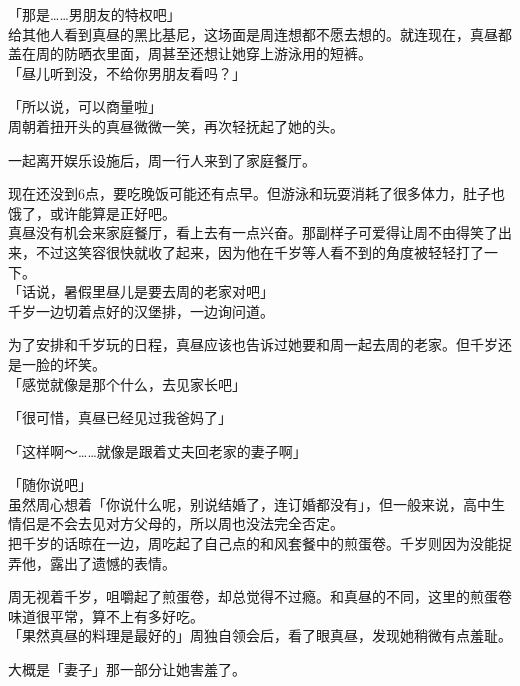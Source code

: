 「那是……男朋友的特权吧」\\

给其他人看到真昼的黑比基尼，这场面是周连想都不愿去想的。就连现在，真昼都盖在周的防晒衣里面，周甚至还想让她穿上游泳用的短裤。\\

「昼儿听到没，不给你男朋友看吗？」

「所以说，可以商量啦」\\

周朝着扭开头的真昼微微一笑，再次轻抚起了她的头。\\

\vspace{2\baselineskip}

一起离开娱乐设施后，周一行人来到了家庭餐厅。

现在还没到6点，要吃晚饭可能还有点早。但游泳和玩耍消耗了很多体力，肚子也饿了，或许能算是正好吧。\\

真昼没有机会来家庭餐厅，看上去有一点兴奋。那副样子可爱得让周不由得笑了出来，不过这笑容很快就收了起来，因为他在千岁等人看不到的角度被轻轻打了一下。\\

「话说，暑假里昼儿是要去周的老家对吧」\\

千岁一边切着点好的汉堡排，一边询问道。

为了安排和千岁玩的日程，真昼应该也告诉过她要和周一起去周的老家。但千岁还是一脸的坏笑。\\

「感觉就像是那个什么，去见家长吧」

「很可惜，真昼已经见过我爸妈了」

「这样啊～……就像是跟着丈夫回老家的妻子啊」

「随你说吧」\\

虽然周心想着「你说什么呢，别说结婚了，连订婚都没有」，但一般来说，高中生情侣是不会去见对方父母的，所以周也没法完全否定。\\

把千岁的话晾在一边，周吃起了自己点的和风套餐中的煎蛋卷。千岁则因为没能捉弄他，露出了遗憾的表情。

周无视着千岁，咀嚼起了煎蛋卷，却总觉得不过瘾。和真昼的不同，这里的煎蛋卷味道很平常，算不上有多好吃。\\

「果然真昼的料理是最好的」周独自领会后，看了眼真昼，发现她稍微有点羞耻。

大概是「妻子」那一部分让她害羞了。\\

